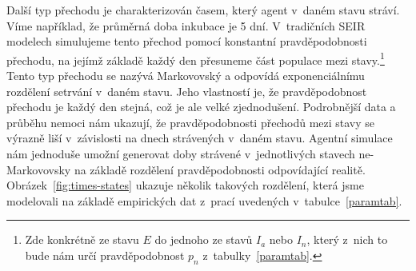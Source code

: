 Další typ přechodu je charakterizován časem, který agent v~daném stavu stráví. Víme například, že průměrná doba inkubace je 5 dní. V~tradičních SEIR modelech simulujeme tento přechod pomocí konstantní pravděpodobnosti přechodu, na jejímž základě každý den přesuneme část populace mezi stavy.\footnote{Zde konkrétně ze stavu $E$ do jednoho ze stavů $I_a$ nebo $I_n$, který z~nich to bude nám určí pravděpodobnost $p_n$ z~tabulky~\ref{paramtab}.} Tento typ přechodu se nazývá Markovovský a odpovídá exponenciálnímu rozdělení setrvání v~daném stavu. Jeho vlastností je, že pravděpodobnost přechodu je každý den stejná, což je ale velké zjednodušení. Podrobnější data a průběhu nemoci nám ukazují, že pravděpodobnosti přechodů mezi stavy se výrazně liší v~závislosti na dnech strávených v~daném stavu. Agentní simulace nám jednoduše umožní generovat doby strávené v~jednotlivých stavech ne-Markovovsky na základě rozdělení pravděpodobnosti odpovídající realitě. Obrázek~\ref{fig:times-states} ukazuje několik takových rozdělení, která jsme modelovali na základě empirických dat z~prací uvedených v~tabulce~\ref{paramtab}.   


